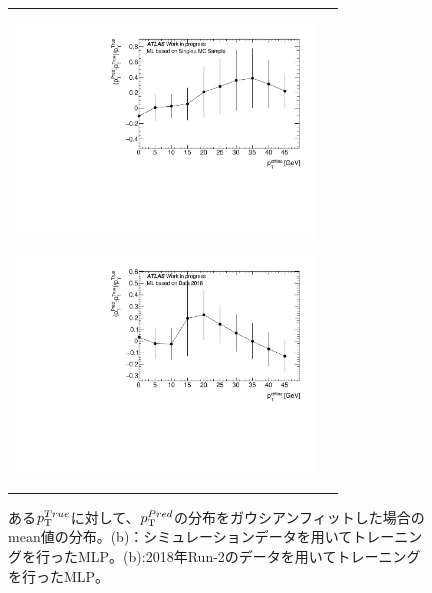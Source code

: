 \begin{figure}
    \begin{tabular}{cc}
    \centering
    \begin{minipage}[b]{0.45\hsize}%
        \centering
        \hspace*{-1.5cm}
        \includegraphics[clip, width=8cm]{fig/4/MC_predtrue_perpt.pdf}
        \subcaption{}
        \label{Gauspredtrue_MC}
    \end{minipage}%
    \begin{minipage}[b]{0.7\hsize}%
        \centering
        \hspace*{-0.5cm}
        \includegraphics[clip, width=8cm]{fig/4/predtrue_perpt.pdf}
        \subcaption{}
        \label{Gauspredtrue_data}
    \end{minipage}%
    \end{tabular}
    \caption{ある$p_{\rm{T}}^{True}$に対して、$p_{\rm{T}}^{Pred}$の分布をガウシアンフィットした場合のmean値の分布。(b)：シミュレーションデータを用いてトレーニングを行ったMLP。(b):2018年Run-2のデータを用いてトレーニングを行ったMLP。}
    \label{Gauspredtrue}
\end{figure}


